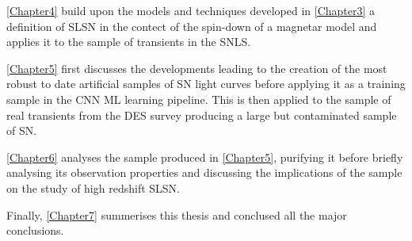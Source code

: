 \cref{Chapter4} build upon the models and techniques developed in \cref{Chapter3} a definition of SLSN in the contect of the spin-down of a magnetar model and applies it to the sample of transients in the SNLS.

\cref{Chapter5} first discusses the developments leading to the creation of the most robust to date artificial samples of SN light curves before applying it as a training sample in the CNN ML learning pipeline. This is then applied to the sample of real transients from the DES survey producing a large but contaminated sample of SN.

\cref{Chapter6} analyses the sample produced in \cref{Chapter5}, purifying it before briefly analysing its observation properties and discussing the implications of the sample on the study of high redshift SLSN.

Finally, \cref{Chapter7} summerises this thesis and conclused all the major conclusions.
